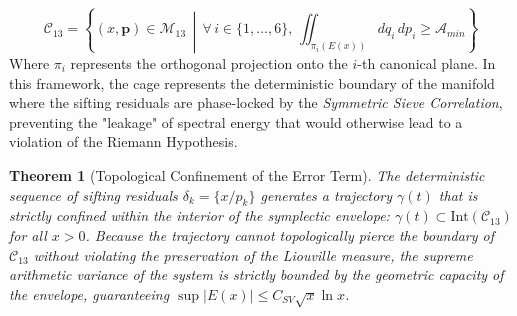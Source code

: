 \documentclass[sn-mathphys-num, pdflatex]{sn-jnl}
\newtheorem{theorem}{Theorem}[section]
\begin{document}
\begin{equation}
\mathcal{C}_{13} = \left\{ (x, \mathbf{p}) \in \mathcal{M}_{13} \, \middle| \, \forall \, i \in \{1, \dots, 6\}, \, \iint_{\pi_i(E(x))} dq_i \, dp_i \ge \mathcal{A}_{min} \right\}
\end{equation}
Where $\pi_i$ represents the orthogonal projection onto the $i$-th canonical plane.
In this framework, the cage represents the deterministic boundary of the manifold where the sifting residuals are phase-locked by the \textit{Symmetric Sieve Correlation}, preventing the "leakage" of spectral energy that would otherwise lead to a violation of the Riemann Hypothesis.
\begin{theorem}[Topological Confinement of the Error Term]
The deterministic sequence of sifting residuals $\delta_k = \{x/p_k\}$ generates a trajectory $\gamma(t)$ that is strictly confined within the interior of the symplectic envelope: $\gamma(t) \subset \text{Int}(\mathcal{C}_{13})$ for all $x > 0$. Because the trajectory cannot topologically pierce the boundary of $\mathcal{C}_{13}$ without violating the preservation of the Liouville measure, the supreme arithmetic variance of the system is strictly bounded by the geometric capacity of the envelope, guaranteeing $\sup |E(x)| \le C_{SV} \sqrt{x} \ln x$.
\end{theorem}
\end{document}
